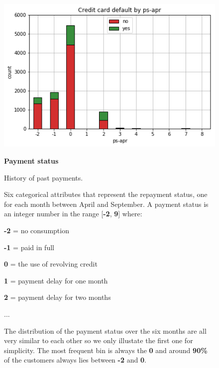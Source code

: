 \smallskip
\begin{figure}[h]
  \begin{minipage}[h]{.50\textwidth}
    \includegraphics[width=.95\textwidth]{img/ch2/payment_status_1}
  \end{minipage}
  \begin{minipage}[h]{.50\textwidth}
        {\Large \textbf{Payment status}}
        
        History of past payments.
        
        Six categorical attributes that represent the repayment status, one for each month between April and September.
        A payment status is an integer number in the range [\textbf{-2}, \textbf{9}] where:
        
         \textbf{-2} = no consumption
         
         \textbf{-1} = paid in full
         
         \textbf{0} = the use of revolving credit

         \textbf{1} = payment delay for one month

         \textbf{2} = payment delay for two months
         
         ...
         
         The distribution of the payment status over the six months are all very similar to each other so we only illustate the first one for simplicity.
         The most frequent bin is always the \textbf{0} and around \textbf{90\%} of the customers always lies between \textbf{-2} and \textbf{0}. 
        
  \end{minipage}
\end{figure}

